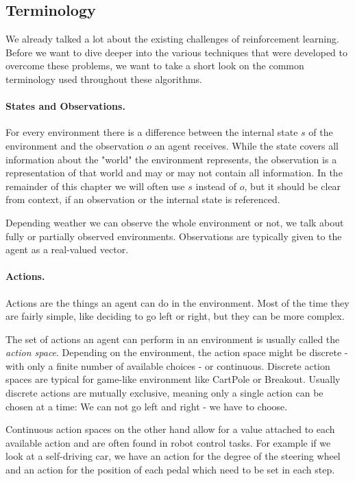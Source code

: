 \subsection{Terminology} \label{ssec:rlterms}
We already talked a lot about the existing challenges of reinforcement learning. Before we want to dive deeper into the various techniques that were developed to overcome these problems, we want to take a short look on the common terminology used throughout these algorithms.

\paragraph{States and Observations.}
For every environment there is a difference between the internal state $s$ of the environment and the observation $o$ an agent receives. While the state covers all information about the "world" the environment represents, the observation is a representation of that world and may or may not contain all information.  In the remainder of this chapter we will often use $s$ instead of $o$, but it should be clear from context, if an observation or the internal state is referenced. 

Depending weather we can observe the whole environment or not, we talk about fully or partially observed environments. Observations are typically given to the agent as a real-valued vector.

\paragraph{Actions.}
Actions are the things an agent can do in the environment. Most of the time they are fairly simple, like deciding to go left or right, but they can be more complex.

The set of actions an agent can perform in an environment is usually called the \textit{action space}. Depending on the environment, the action space might be discrete - with only a finite number of available choices - or continuous. Discrete action spaces are typical for game-like environment like CartPole or Breakout. Usually discrete actions are mutually exclusive, meaning only a single action can be chosen at a time: We can not go left and right - we have to choose.

Continuous action spaces on the other hand allow for a value attached to each available action and are often found in robot control tasks. For example if we look at a self-driving car, we have an action for the degree of the steering wheel and an action for the position of each pedal which need to be set in each step.

